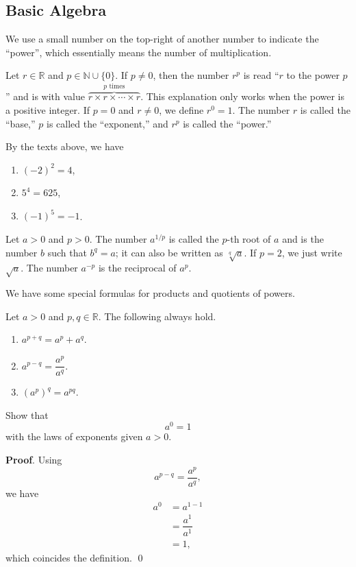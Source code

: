 \documentclass[11pt]{book}
\theoremstyle{break}
\theoremstyle{no_label}
\newcommand{\bbR}{\mathbb{R}}
\newcommand{\bbN}{\mathbb{N}}
\numberwithin{equation}{section}
\begin{document}
\subsection*{Basic Algebra}

We use a small number on the top-right of another number to indicate the ``power'', which essentially means the number of multiplication.
\begin{notation}
    Let $r\in\bbR$ and $p\in\bbN\cup\{0\}$. If $p\ne0$, then the number $r^p$ is read ``$r$ to the power $p$'' and is with value $\overbrace{r\times r\times \cdots\times r}^{\text{$p$ times}}$. This explanation only works when the power is a positive integer. If $p=0$ and $r\ne0$, we define $r^0=1$. The number $r$ is called the ``base,'' $p$ is called the ``exponent,'' and $r^p$ is called the ``power.''
\end{notation}

\begin{example}
    By the texts above, we have 
    \begin{enumerate}
        \item $(-2)^2=4$,
        \item $5^4=625$,
        \item $(-1)^5=-1$.
    \end{enumerate}
\end{example}

\begin{notation}
    Let $a>0$ and $p>0$. The number $a^{1/p}$ is called the $p$-th root of $a$ and is the number $b$ such that $b^q=a$; it can also be written as $\sqrt[q]{a}$. If $p=2$, we just write $\sqrt{a}$. The number $a^{-p}$ is the reciprocal of $a^p$.
\end{notation}

We have some special formulas for products and quotients of powers.

\begin{theorem}
    Let $a>0$ and $p, q\in\mathbb R$. The following always hold.
    \begin{enumerate}
        \item $a^{p+q}=a^p+a^q$.
        \item $a^{p-q}=\dfrac{a^p}{a^q}$.
        \item $(a^p)^q=a^{pq}$.
    \end{enumerate}
\end{theorem}

\begin{example}
    Show that $$a^0=1$$ with the laws of exponents given $a>0$.
\end{example}
\textbf{Proof}. Using $$a^{p-q}=\dfrac{a^p}{a^q},$$ we have 
\begin{align*}
    a^0&=a^{1-1}\\
    &=\dfrac{a^1}{a^1}\\
    &=1,
\end{align*}
which coincides the definition. \qed
\end{document}
